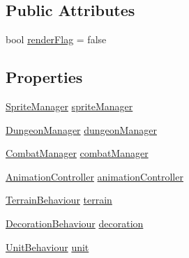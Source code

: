 \subsection*{Public Attributes}
\begin{DoxyCompactItemize}
\item 
bool \mbox{\hyperlink{class_tile_a1a28313208606507b9c570a141461eab}{render\+Flag}} = false
\end{DoxyCompactItemize}
\subsection*{Properties}
\begin{DoxyCompactItemize}
\item 
\mbox{\hyperlink{class_sprite_manager}{Sprite\+Manager}} \mbox{\hyperlink{class_tile_a4a7a173c171f17656e7aa129ed46c17c}{sprite\+Manager}}
\item 
\mbox{\hyperlink{class_dungeon_manager}{Dungeon\+Manager}} \mbox{\hyperlink{class_tile_adcabb3e4a403331969c0b2c08c79ff1c}{dungeon\+Manager}}
\item 
\mbox{\hyperlink{class_combat_manager}{Combat\+Manager}} \mbox{\hyperlink{class_tile_a4428192093c158009bdd3b1c12e2bd7b}{combat\+Manager}}
\item 
\mbox{\hyperlink{class_animation_controller}{Animation\+Controller}} \mbox{\hyperlink{class_tile_a539da027add6656c04726ee3f8c169a3}{animation\+Controller}}
\item 
\mbox{\hyperlink{class_terrain_behaviour}{Terrain\+Behaviour}} \mbox{\hyperlink{class_tile_af45cdc1d322c30f61893f1e7de16e668}{terrain}}
\item 
\mbox{\hyperlink{class_decoration_behaviour}{Decoration\+Behaviour}} \mbox{\hyperlink{class_tile_a22382e29b7dc7171420e4df600ad3ea4}{decoration}}
\item 
\mbox{\hyperlink{class_unit_behaviour}{Unit\+Behaviour}} \mbox{\hyperlink{class_tile_ac8a152fbb0fd0aec60d876b86bf1cb66}{unit}}

\end{DoxyCompactItemize}

